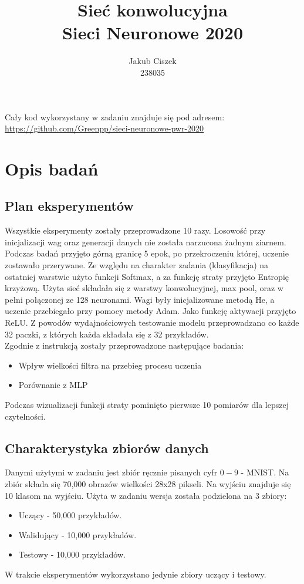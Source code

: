 \documentclass{article}
\title{  Sieć konwolucyjna\\Sieci Neuronowe 2020 }
\author{
  Jakub Ciszek \\
  238035\\
}
\begin{document}
\maketitle

\newpage
\tableofcontents
\newpage

Cały kod wykorzystany w zadaniu znajduje się pod adresem: \url{https://github.com/Greenpp/sieci-neuronowe-pwr-2020}

\section{Opis badań}
\subsection{Plan eksperymentów}

Wszystkie eksperymenty zostały przeprowadzone 10 razy. Losowość przy inicjalizacji wag oraz generacji danych nie została narzucona żadnym ziarnem. Podczas badań przyjęto górną granicę 5 epok, po przekroczeniu której, uczenie zostawało przerywane. Ze względu na charakter zadania (klasyfikacja) na ostatniej warstwie użyto funkcji Softmax, a za funkcję straty przyjęto Entropię krzyżową. Użyta sieć składała się z warstwy konwolucyjnej, max pool, oraz w pełni połączonej ze 128 neuronami. Wagi były inicjalizowane metodą He, a uczenie przebiegało przy pomocy metody Adam. Jako funkcję aktywacji przyjęto ReLU.
Z powodów wydajnościowych testowanie modelu przeprowadzano co każde 32 paczki, z których każda składała się z 32 przykładów.\\
Zgodnie z instrukcją zostały przeprowadzone następujące badania:
\begin{itemize}
	\item Wpływ wielkości filtra na przebieg procesu uczenia
	\item Porównanie z MLP    
\end{itemize}
Podczas wizualizacji funkcji straty pominięto pierwsze 10 pomiarów dla lepszej czytelności.

\subsection{Charakterystyka zbiorów danych}

Danymi użytymi w zadaniu jest zbiór ręcznie pisanych cyfr \(0-9\) - MNIST. Na zbiór składa się 70,000 obrazów wielkości 28x28 pikseli. Na wyjściu znajduje się 10 klasom na wyjściu. Użyta w zadaniu wersja została podzielona na 3 zbiory:
\begin{itemize}
	\item Uczący - 50,000 przykładów.
	\item Walidujący - 10,000 przykładów.
	\item Testowy - 10,000 przykładów.
\end{itemize}
W trakcie eksperymentów wykorzystano jedynie zbiory uczący i testowy.
\end{document}
